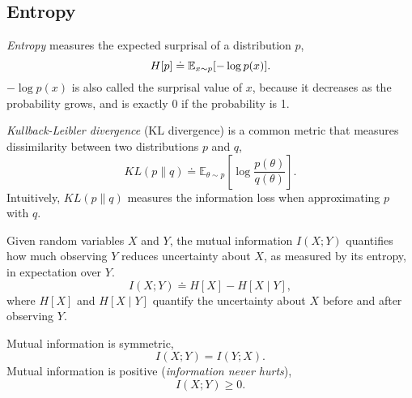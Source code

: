 \subsection{Entropy}

\begin{definition}[Entropy]
    \textit{Entropy} measures the expected surprisal of a distribution $p$, \[
        H[p] \doteq \mathbb{E}_{x\sim p}[-\log p(x)].
    \]
    $-\log p(x)$ is also called the surprisal value of $x$, because it decreases
    as the probability grows, and is exactly 0 if the probability is 1.
\end{definition}

\begin{definition}
    \textit{Kullback-Leibler divergence} (KL divergence) is a common metric that
    measures dissimilarity between two distributions $p$ and $q$, \[
        KL(p \| q) \doteq \mathbb{E}_{\theta\sim p} \left[ \log \frac{p(\theta)}{q(\theta)} \right].
    \]
    Intuitively, $KL(p \| q)$ measures the information loss when approximating
    $p$ with $q$.
\end{definition}

\begin{definition}
    Given random variables $X$ and $Y$, the mutual information $I(X;Y)$
    quantifies how much observing $Y$ reduces uncertainty about $X$, as
    measured by its entropy, in expectation over $Y$. \[
        I(X;Y) \doteq H[X] - H[X \mid Y],
    \]
    where $H[X]$ and $H[X\mid Y]$ quantify the uncertainty about $X$ before and
    after observing $Y$.
\end{definition}

\begin{properties}
    Mutual information is symmetric, \[
        I(X;Y) = I(Y;X).
    \]
    Mutual information is positive (\textit{information never hurts}), \[
        I(X;Y) \geq 0.
    \]
\end{properties}

